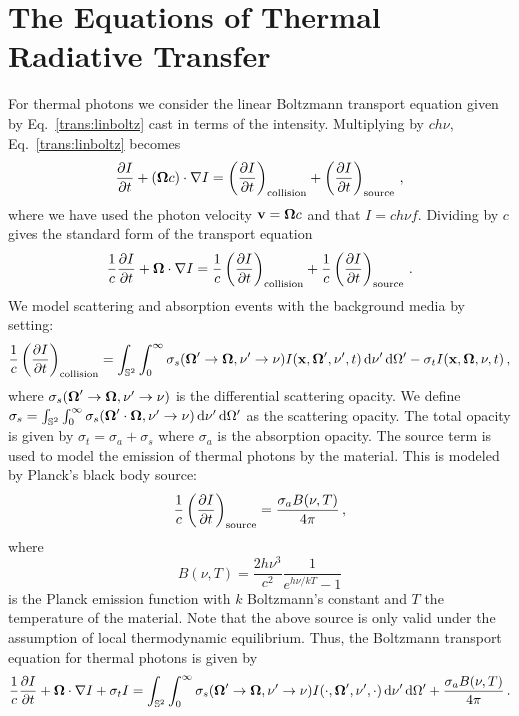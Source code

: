 \documentclass[../doc.tex]{subfiles}
\begin{document}
\section{The Equations of Thermal Radiative Transfer}
For thermal photons we consider the linear Boltzmann transport equation given by Eq.~\ref{trans:linboltz} cast in terms of the intensity. Multiplying by $c h\nu $, Eq.~\ref{trans:linboltz} becomes 
	\begin{equation}
		\frac{\partial I}{\partial t} + (\boldsymbol{\Omega} c) \cdot \nabla I = \left( \frac{\partial I}{\partial t} \right)_\text{collision} + \left( \frac{\partial I}{\partial t} \right)_\text{source} \,, 
	\end{equation}
where we have used the photon velocity $\boldsymbol{\mathrm{v}} = \boldsymbol{\Omega} c$ and that $I = ch\nu f$. Dividing by $c$ gives the standard form of the transport equation 
	\begin{equation}
		\frac{1}{c}\frac{\partial I}{\partial t} + \boldsymbol{\Omega}\cdot \nabla I = \frac{1}{c} \left( \frac{\partial I}{\partial t} \right)_\text{collision} + \frac{1}{c}\left( \frac{\partial I}{\partial t} \right)_\text{source} \,. 
	\end{equation}
We model scattering and absorption events with the background media by setting: 
	\begin{equation}
		\frac{1}{c}\left( \frac{\partial I}{\partial t} \right)_\text{collision} = \int_{\mathbb{S}^2} \int_0^\infty \sigma_s(\boldsymbol{\Omega}'\rightarrow \boldsymbol{\Omega}, \nu' \rightarrow \nu) I(\boldsymbol{\mathrm{x}},\boldsymbol{\Omega}',\nu',t) \mathop{}\!\mathrm{d} \nu' \mathop{}\!\mathrm{d} \Omega' - \sigma_t I(\boldsymbol{\mathrm{x}},\boldsymbol{\Omega},\nu,t) \,,
	\end{equation}
where $\sigma_s(\boldsymbol{\Omega}'\rightarrow\boldsymbol{\Omega},\nu'\rightarrow \nu)$ is the differential scattering opacity. We define $\sigma_s = \int_{\mathbb{S}^2} \int_0^\infty \sigma_s(\boldsymbol{\Omega}'\cdot\boldsymbol{\Omega},\nu'\rightarrow\nu) \mathop{}\!\mathrm{d} \nu'\mathop{}\!\mathrm{d}\Omega'$ as the scattering opacity. The total opacity is given by $\sigma_t = \sigma_a + \sigma_s$ where $\sigma_a$ is the absorption opacity. The source term is used to model the emission of thermal photons by the material. This is modeled by Planck's black body source: 
	\begin{equation}
		\frac{1}{c}\left( \frac{\partial I}{\partial t} \right)_\text{source} =\frac{\sigma_a B(\nu,T)}{4\pi} \,,
	\end{equation}
where
	\begin{equation}
		B(\nu,T) = \frac{2h\nu^3}{c^2}\frac{1}{e^{h\nu/kT}-1}
	\end{equation}
is the Planck emission function with $k$ Boltzmann's constant and $T$ the temperature of the material. Note that the above source is only valid under the assumption of local thermodynamic equilibrium. 
Thus, the Boltzmann transport equation for thermal photons is given by 
	\begin{equation} \label{trans:trans_photon}
		\frac{1}{c}\frac{\partial I}{\partial t} + \boldsymbol{\Omega}\cdot\nabla I + \sigma_t I = \int_{\mathbb{S}^2}\int_0^\infty \sigma_s(\boldsymbol{\Omega}'\rightarrow\boldsymbol{\Omega},\nu'\rightarrow \nu) I(\cdot,\boldsymbol{\Omega}',\nu',\cdot) \mathop{}\!\mathrm{d} \nu'\mathop{}\!\mathrm{d}\Omega' + \frac{\sigma_a B(\nu,T)}{4\pi} \,. 
	\end{equation}
\end{document}
